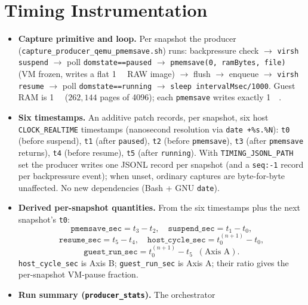 \documentclass[conference]{IEEEtran}
\begin{document}
\section{Timing Instrumentation}
\label{sec:method}
\begin{itemize}
  \item \textbf{Capture primitive and loop.} Per snapshot the producer
        (\texttt{capture\_producer\_qemu\_pmemsave.sh}) runs:
        backpressure check $\rightarrow$ \texttt{virsh suspend} $\rightarrow$
        poll \texttt{domstate==paused} $\rightarrow$
        \texttt{pmemsave(0, ramBytes, file)} (VM frozen, writes a flat
        \SI{1}{\gibi\byte} RAW image) $\rightarrow$ flush $\rightarrow$
        enqueue $\rightarrow$ \texttt{virsh resume} $\rightarrow$ poll
        \texttt{domstate==running} $\rightarrow$
        \texttt{sleep intervalMsec/1000}. Guest RAM is \SI{1}{\gibi\byte}
        ($262{,}144$ pages of \SI{4096}{\byte}); each \texttt{pmemsave} writes
        exactly \SI{1}{\gibi\byte}.
  \item \textbf{Six timestamps.} An additive patch records, per snapshot, six
        host \texttt{CLOCK\_REALTIME} timestamps (nanosecond resolution via
        \texttt{date +\%s.\%N}):
        \texttt{t0} (before suspend), \texttt{t1} (after \texttt{paused}),
        \texttt{t2} (before \texttt{pmemsave}), \texttt{t3} (after
        \texttt{pmemsave} returns), \texttt{t4} (before resume), \texttt{t5}
        (after \texttt{running}). With \texttt{TIMING\_JSONL\_PATH} set the
        producer writes one JSONL record per snapshot (and a \texttt{seq:-1}
        record per backpressure event); when unset, ordinary captures are
        byte-for-byte unaffected. No new dependencies (Bash + GNU
        \texttt{date}).
  \item \textbf{Derived per-snapshot quantities.} From the six timestamps plus
        the next snapshot's \texttt{t0}:
        \[
          \texttt{pmemsave\_sec} = t_3 - t_2,\quad
          \texttt{suspend\_sec} = t_1 - t_0,
        \]
        \[
          \texttt{resume\_sec} = t_5 - t_4,\quad
          \texttt{host\_cycle\_sec} = t_0^{(n{+}1)} - t_0,
        \]
        \[
          \texttt{guest\_run\_sec} = t_0^{(n{+}1)} - t_5 \;\; (\text{Axis A}).
        \]
        \texttt{host\_cycle\_sec} is Axis B; \texttt{guest\_run\_sec} is
        Axis A; their ratio gives the per-snapshot VM-pause fraction.
  \item \textbf{Run summary (\texttt{producer\_stats}).} The orchestrator

\end{itemize}
\end{document}

